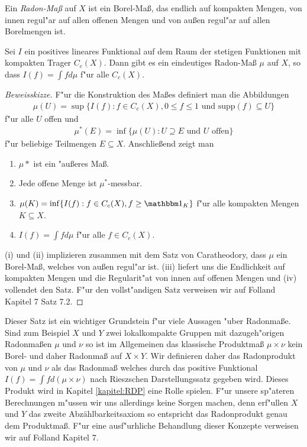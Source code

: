	
	\begin{defi}
		Ein \emph{Radon-Maß} auf $X$ ist ein Borel-Maß, das endlich auf kompakten Mengen, von innen regul"ar auf allen offenen Mengen und von außen regul"ar auf allen Borelmengen ist.
	\end{defi}
	
	\begin{satz}
		Sei $I$ ein positives lineares Funktional auf dem Raum der stetigen Funktionen mit kompakten Trager $C_c(X)$. Dann gibt es ein eindeutiges Radon-Maß $\mu$ auf $X$, so dass $I(f) = \int f d\mu$ f"ur alle $C_c(X)$.
	\end{satz}
	\begin{proof}[Beweisskizze]
		F"ur die Konstruktion des Maßes definiert man die Abbildungen
		\begin{align*}
			\mu(U) = \sup\{I(f): f\in C_c(X), 0\leq f\leq 1 \text{ und } \text{supp}(f) \subseteq U\}
		\end{align*}
		f"ur alle $U$ offen und
		\begin{align*}
			\mu^*(E) = \inf \{ \mu(U): U\supseteq E \text{ und } U \text{ offen}\}
		\end{align*}
		f"ur beliebige Teilmengen $E\subseteq X$. 
		Anschließend zeigt man
		\begin{enumerate}[label=(\roman*)]
			\item $\mu*$ ist ein "außeres Maß.
			\item Jede offene Menge ist $\mu^*$-messbar.
			\item $\mu(K) = \inf\{I(f): f\in C_c(X), f\geq \ind_K\}$ f"ur alle kompakten Mengen $K \subseteq X$.
			\item $I(f) = \int f d\mu$ f"ur alle $f\in C_c(X)$.
		\end{enumerate}
		(i) und (ii) implizieren zusammen mit dem Satz von Caratheodory, dass $\mu$ ein Borel-Maß, welches von außen regul"ar ist.
		(iii) liefert uns die Endlichkeit auf kompakten Mengen und die Regularit"at von innen auf offenen Mengen und (iv) vollendet den Satz.
		F"ur den vollst"andigen Satz verweisen wir auf Folland \cite{folland} Kapitel 7 Satz 7.2.
	\end{proof}
	Dieser Satz ist ein wichtiger Grundstein f"ur viele Aussagen "uber Radonmaße.
	Sind zum Beispiel $X$ und $Y$ zwei lokalkompakte Gruppen mit dazugeh"origen Radonmaßen $\mu$ und $\nu$ so ist im Allgemeinen das klassische Produktmaß $\mu \times \nu$ kein Borel- und daher Radonmaß auf $X \times Y$.
	Wir definieren daher das Radonprodukt von $\mu$ und $\nu$ als das Radonmaß welches durch das positive Funktional $I(f) = \int f d(\mu \times \nu)$ nach Rieszschen Darstellungssatz gegeben wird.
	Dieses Produkt wird in Kapitel \ref{kapitel:RDP} eine Rolle spielen.
	F"ur unsere sp"ateren Berechnungen m"ussen wir uns allerdings keine Sorgen machen, denn erf"ullen $X$ und $Y$ das zweite Abzählbarkeitsaxiom so entspricht das Radonprodukt genau dem Produktmaß.
	F"ur eine ausf"urhliche Behandlung dieser Konzepte verweisen wir auf Folland \cite{folland} Kapitel 7.
	
